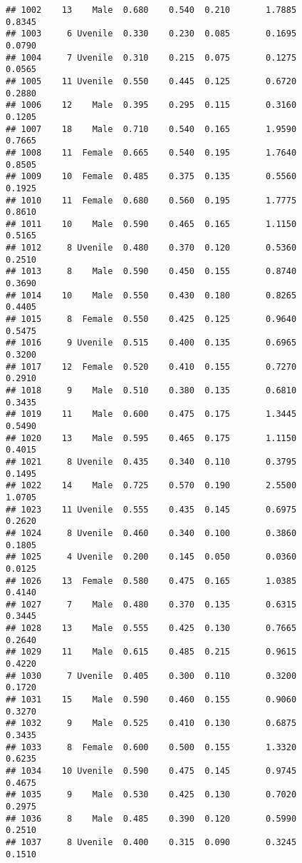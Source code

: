 \documentclass[
]{article}
\begin{document}
\begin{verbatim}
## 1002    13    Male  0.680    0.540  0.210       1.7885         0.8345
## 1003     6 Uvenile  0.330    0.230  0.085       0.1695         0.0790
## 1004     7 Uvenile  0.310    0.215  0.075       0.1275         0.0565
## 1005    11 Uvenile  0.550    0.445  0.125       0.6720         0.2880
## 1006    12    Male  0.395    0.295  0.115       0.3160         0.1205
## 1007    18    Male  0.710    0.540  0.165       1.9590         0.7665
## 1008    11  Female  0.665    0.540  0.195       1.7640         0.8505
## 1009    10  Female  0.485    0.375  0.135       0.5560         0.1925
## 1010    11  Female  0.680    0.560  0.195       1.7775         0.8610
## 1011    10    Male  0.590    0.465  0.165       1.1150         0.5165
## 1012     8 Uvenile  0.480    0.370  0.120       0.5360         0.2510
## 1013     8    Male  0.590    0.450  0.155       0.8740         0.3690
## 1014    10    Male  0.550    0.430  0.180       0.8265         0.4405
## 1015     8  Female  0.550    0.425  0.125       0.9640         0.5475
## 1016     9 Uvenile  0.515    0.400  0.135       0.6965         0.3200
## 1017    12  Female  0.520    0.410  0.155       0.7270         0.2910
## 1018     9    Male  0.510    0.380  0.135       0.6810         0.3435
## 1019    11    Male  0.600    0.475  0.175       1.3445         0.5490
## 1020    13    Male  0.595    0.465  0.175       1.1150         0.4015
## 1021     8 Uvenile  0.435    0.340  0.110       0.3795         0.1495
## 1022    14    Male  0.725    0.570  0.190       2.5500         1.0705
## 1023    11 Uvenile  0.555    0.435  0.145       0.6975         0.2620
## 1024     8 Uvenile  0.460    0.340  0.100       0.3860         0.1805
## 1025     4 Uvenile  0.200    0.145  0.050       0.0360         0.0125
## 1026    13  Female  0.580    0.475  0.165       1.0385         0.4140
## 1027     7    Male  0.480    0.370  0.135       0.6315         0.3445
## 1028    13    Male  0.555    0.425  0.130       0.7665         0.2640
## 1029    11    Male  0.615    0.485  0.215       0.9615         0.4220
## 1030     7 Uvenile  0.405    0.300  0.110       0.3200         0.1720
## 1031    15    Male  0.590    0.460  0.155       0.9060         0.3270
## 1032     9    Male  0.525    0.410  0.130       0.6875         0.3435
## 1033     8  Female  0.600    0.500  0.155       1.3320         0.6235
## 1034    10 Uvenile  0.590    0.475  0.145       0.9745         0.4675
## 1035     9    Male  0.530    0.425  0.130       0.7020         0.2975
## 1036     8    Male  0.485    0.390  0.120       0.5990         0.2510
## 1037     8 Uvenile  0.400    0.315  0.090       0.3245         0.1510

\end{verbatim}
\end{document}
